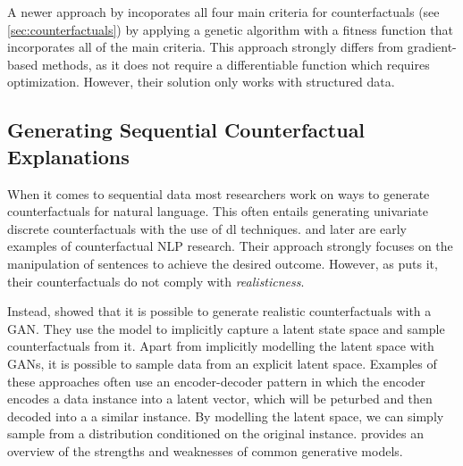 \documentclass[12pt,a4paper]{report}
\begin{document}
A newer approach by \citeauthor{dandl_MultiObjectiveCounterfactualExplanations_2020} incoporates all four main criteria for counterfactuals (see \autoref{sec:counterfactuals}) by applying a genetic algorithm with a fitness function that incorporates all of the main criteria\needscite. This approach strongly differs from gradient-based methods, as it does not require a differentiable function which requires optimization.
However, their solution only works with structured data.

\subsection{Generating Sequential Counterfactual Explanations}
When it comes to sequential data most researchers work on ways to generate counterfactuals for natural language. This often entails generating univariate discrete counterfactuals with the use of \gls{dl} techniques. \citeauthor{martens_ExplainingDatadrivenDocument_2014} and later \citeauthor{krause_InteractingPredictionsVisual_2016} are early examples of counterfactual NLP research. Their approach strongly focuses on the manipulation of sentences to achieve the desired outcome. However, as \citeauthor{robeer_GeneratingRealisticNatural_2021} puts it, their counterfactuals do not comply with \emph{realisticness}.

Instead, \citeauthor{robeer_GeneratingRealisticNatural_2021} showed that it is possible to generate realistic counterfactuals with a \gls{GAN}. They use the model to implicitly capture a latent state space and sample counterfactuals from it. Apart from implicitly modelling the latent space with \glspl{GAN}, it is possible to sample data from an explicit latent space. Examples of these approaches often use an encoder-decoder pattern in which the encoder encodes a data instance into a latent vector, which will be peturbed and then decoded into a a similar instance\autocite{melnyk_ImprovedNeuralText_2017}\autocite{wang_ControllableUnsupervisedText_2019}. By modelling the latent space, we can simply sample from a distribution conditioned on the original instance. \citeauthor{bond-taylor_DeepGenerativeModelling_2021} provides an overview of the strengths and weaknesses of common generative models.
\end{document}
